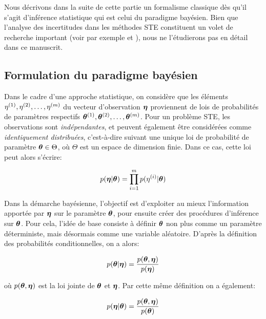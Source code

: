	Nous décrivons dans la suite de cette partie un formalisme classique dès qu'il s'agit d'inférence statistique qui est celui du paradigme bayésien. Bien que l'analyse des incertitudes dans les méthodes STE constituent un volet de recherche important (voir par exemple \cite{Rodriguez2011} et \cite{Rodriguez2013}), nous ne l'étudierons pas en détail dans ce manuscrit. \\
	
	\subsection{Formulation du paradigme bayésien}
	\label{paragraphe_paradigme_bayesien}
	
	Dans le cadre d'une approche statistique, on considère que les éléments ${\eta}^{(1)}, {\eta}^{(2)}, \dots, {\eta}^{(m)}$ du vecteur d'observation ${\bm{\eta}}$ proviennent de lois de probabilités de paramètres respectifs ${\bm{\theta}}^{(1)}, {\bm{\theta}}^{(2)}, \dots, {\bm{\theta}}^{(m)}$. Pour un problème STE, les observations sont \textit{indépendantes}, et peuvent également être considérées comme \textit{identiquement distribuées}, c'est-à-dire suivant une unique loi de probabilité de paramètre ${\bm{\theta}} \in \Theta$, où $\Theta$ est un espace de dimension finie. Dans ce cas, cette loi peut alors s'écrire:
	
	\begin{equation}
		p({\bm{\eta}} | {\bm{\theta}}) = \prod_{i=1}^m p({\eta}^{(i)} | {\bm{\theta}})
		\label{eq_bayesien_modele_observation}
	\end{equation}
	
	Dans la démarche bayésienne, l'objectif est d'exploiter au mieux l'information apportée par ${\bm{\eta}}$ sur le paramètre ${\bm{\theta}}$, pour ensuite créer des procédures d'inférence sur ${\bm{\theta}}$. Pour cela, l'idée de base consiste à définir ${\bm{\theta}}$ non plus comme un paramètre déterministe, mais désormais comme une variable aléatoire. D'après la définition des probabilités conditionnelles, on a alors:
	
	\begin{equation}
		p({\bm{\theta}} | {\bm{\eta}}) = \dfrac{p({\bm{\theta}}, {\bm{\eta}})}{p({\bm{\eta}})}
		\label{equation_pre_bayes_1}
	\end{equation}
	
	où $p({\bm{\theta}}, {\bm{\eta}})$ est la loi jointe de ${\bm{\theta}}$ et ${\bm{\eta}}$. Par cette même définition on a également:
	
	\begin{equation}
		p({\bm{\eta}} | {\bm{\theta}}) =  \dfrac{p({\bm{\theta}}, {\bm{\eta}})}{p({\bm{\theta}})}
		\label{equation_pre_bayes_2}
	\end{equation}
	
